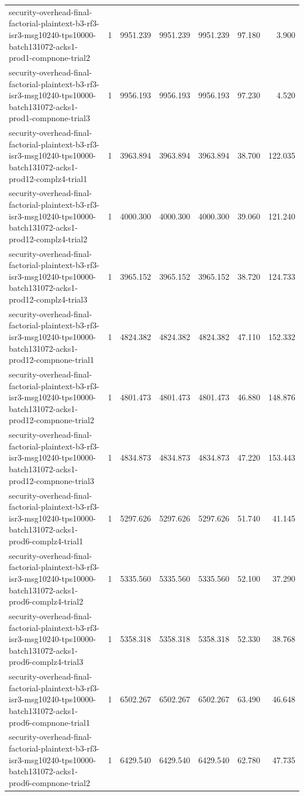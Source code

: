 \begin{tabular}{lrrrrrr}
security-overhead-final-factorial-plaintext-b3-rf3-isr3-msg10240-tps10000-batch131072-acks1-prod1-compnone-trial2 & 1 & 9951.239 & 9951.239 & 9951.239 & 97.180 & 3.900 \\
security-overhead-final-factorial-plaintext-b3-rf3-isr3-msg10240-tps10000-batch131072-acks1-prod1-compnone-trial3 & 1 & 9956.193 & 9956.193 & 9956.193 & 97.230 & 4.520 \\
security-overhead-final-factorial-plaintext-b3-rf3-isr3-msg10240-tps10000-batch131072-acks1-prod12-complz4-trial1 & 1 & 3963.894 & 3963.894 & 3963.894 & 38.700 & 122.035 \\
security-overhead-final-factorial-plaintext-b3-rf3-isr3-msg10240-tps10000-batch131072-acks1-prod12-complz4-trial2 & 1 & 4000.300 & 4000.300 & 4000.300 & 39.060 & 121.240 \\
security-overhead-final-factorial-plaintext-b3-rf3-isr3-msg10240-tps10000-batch131072-acks1-prod12-complz4-trial3 & 1 & 3965.152 & 3965.152 & 3965.152 & 38.720 & 124.733 \\
security-overhead-final-factorial-plaintext-b3-rf3-isr3-msg10240-tps10000-batch131072-acks1-prod12-compnone-trial1 & 1 & 4824.382 & 4824.382 & 4824.382 & 47.110 & 152.332 \\
security-overhead-final-factorial-plaintext-b3-rf3-isr3-msg10240-tps10000-batch131072-acks1-prod12-compnone-trial2 & 1 & 4801.473 & 4801.473 & 4801.473 & 46.880 & 148.876 \\
security-overhead-final-factorial-plaintext-b3-rf3-isr3-msg10240-tps10000-batch131072-acks1-prod12-compnone-trial3 & 1 & 4834.873 & 4834.873 & 4834.873 & 47.220 & 153.443 \\
security-overhead-final-factorial-plaintext-b3-rf3-isr3-msg10240-tps10000-batch131072-acks1-prod6-complz4-trial1 & 1 & 5297.626 & 5297.626 & 5297.626 & 51.740 & 41.145 \\
security-overhead-final-factorial-plaintext-b3-rf3-isr3-msg10240-tps10000-batch131072-acks1-prod6-complz4-trial2 & 1 & 5335.560 & 5335.560 & 5335.560 & 52.100 & 37.290 \\
security-overhead-final-factorial-plaintext-b3-rf3-isr3-msg10240-tps10000-batch131072-acks1-prod6-complz4-trial3 & 1 & 5358.318 & 5358.318 & 5358.318 & 52.330 & 38.768 \\
security-overhead-final-factorial-plaintext-b3-rf3-isr3-msg10240-tps10000-batch131072-acks1-prod6-compnone-trial1 & 1 & 6502.267 & 6502.267 & 6502.267 & 63.490 & 46.648 \\
security-overhead-final-factorial-plaintext-b3-rf3-isr3-msg10240-tps10000-batch131072-acks1-prod6-compnone-trial2 & 1 & 6429.540 & 6429.540 & 6429.540 & 62.780 & 47.735 \\

\end{tabular}
